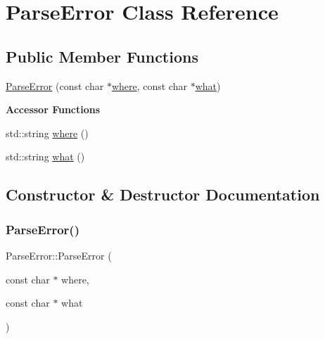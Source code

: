 \hypertarget{classParseError}{}\section{Parse\+Error Class Reference}
\label{classParseError}
\subsection*{Public Member Functions}
\begin{DoxyCompactItemize}
\item 
\mbox{\hyperlink{classParseError_a89210010aa80b9602ef5e57649886937}{Parse\+Error}} (const char $\ast$\mbox{\hyperlink{classParseError_aa725d47c84792c9142267e51c2074f58}{where}}, const char $\ast$\mbox{\hyperlink{classParseError_a08560dce27779ffee6c4bfb0d796aa6e}{what}})
\end{DoxyCompactItemize}
\begin{Indent}\textbf{ Accessor Functions}\par
\begin{DoxyCompactItemize}
\item 
std\+::string \mbox{\hyperlink{classParseError_aa725d47c84792c9142267e51c2074f58}{where}} ()
\item 
std\+::string \mbox{\hyperlink{classParseError_a08560dce27779ffee6c4bfb0d796aa6e}{what}} ()
\end{DoxyCompactItemize}
\end{Indent}


\subsection{Constructor \& Destructor Documentation}
\mbox{\label{classParseError_a89210010aa80b9602ef5e57649886937}} 
\subsubsection{\texorpdfstring{Parse\+Error()}{ParseError()}}
{\footnotesize\ttfamily Parse\+Error\+::\+Parse\+Error (\begin{DoxyParamCaption}\item[{const char $\ast$}]{where,  }\item[{const char $\ast$}]{what }\end{DoxyParamCaption})\hspace{0.3cm}{\ttfamily [inline]}}


